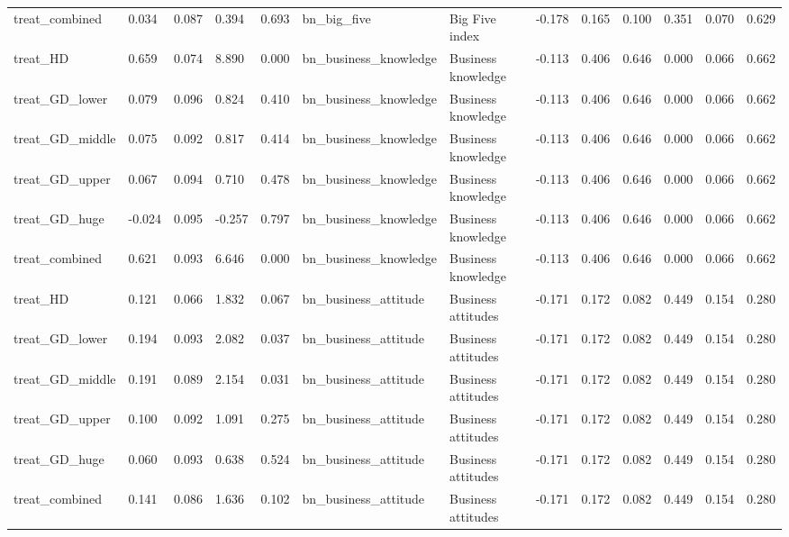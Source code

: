 \begin{tabular}{lllllllllllll}
treat\_combined & 0.034 & 0.087 & 0.394 & 0.693 & bn\_big\_five & Big Five index & -0.178 & 0.165 & 0.100 & 0.351 & 0.070 & 0.629 \\
treat\_HD & 0.659 & 0.074 & 8.890 & 0.000 & bn\_business\_knowledge & Business knowledge & -0.113 & 0.406 & 0.646 & 0.000 & 0.066 & 0.662 \\
treat\_GD\_lower & 0.079 & 0.096 & 0.824 & 0.410 & bn\_business\_knowledge & Business knowledge & -0.113 & 0.406 & 0.646 & 0.000 & 0.066 & 0.662 \\
treat\_GD\_middle & 0.075 & 0.092 & 0.817 & 0.414 & bn\_business\_knowledge & Business knowledge & -0.113 & 0.406 & 0.646 & 0.000 & 0.066 & 0.662 \\
treat\_GD\_upper & 0.067 & 0.094 & 0.710 & 0.478 & bn\_business\_knowledge & Business knowledge & -0.113 & 0.406 & 0.646 & 0.000 & 0.066 & 0.662 \\
treat\_GD\_huge & -0.024 & 0.095 & -0.257 & 0.797 & bn\_business\_knowledge & Business knowledge & -0.113 & 0.406 & 0.646 & 0.000 & 0.066 & 0.662 \\
treat\_combined & 0.621 & 0.093 & 6.646 & 0.000 & bn\_business\_knowledge & Business knowledge & -0.113 & 0.406 & 0.646 & 0.000 & 0.066 & 0.662 \\
treat\_HD & 0.121 & 0.066 & 1.832 & 0.067 & bn\_business\_attitude & Business attitudes & -0.171 & 0.172 & 0.082 & 0.449 & 0.154 & 0.280 \\
treat\_GD\_lower & 0.194 & 0.093 & 2.082 & 0.037 & bn\_business\_attitude & Business attitudes & -0.171 & 0.172 & 0.082 & 0.449 & 0.154 & 0.280 \\
treat\_GD\_middle & 0.191 & 0.089 & 2.154 & 0.031 & bn\_business\_attitude & Business attitudes & -0.171 & 0.172 & 0.082 & 0.449 & 0.154 & 0.280 \\
treat\_GD\_upper & 0.100 & 0.092 & 1.091 & 0.275 & bn\_business\_attitude & Business attitudes & -0.171 & 0.172 & 0.082 & 0.449 & 0.154 & 0.280 \\
treat\_GD\_huge & 0.060 & 0.093 & 0.638 & 0.524 & bn\_business\_attitude & Business attitudes & -0.171 & 0.172 & 0.082 & 0.449 & 0.154 & 0.280 \\
treat\_combined & 0.141 & 0.086 & 1.636 & 0.102 & bn\_business\_attitude & Business attitudes & -0.171 & 0.172 & 0.082 & 0.449 & 0.154 & 0.280 \\
\bottomrule
\end{tabular}
